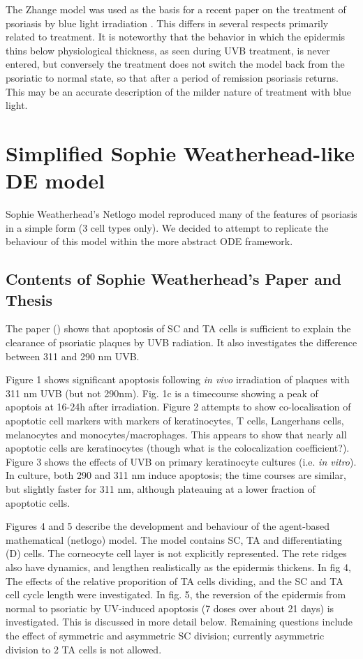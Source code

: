 \documentclass[a4paper,10pt]{report}
\begin{document}
The Zhange model was used as the basis for a recent paper on the treatment of psoriasis by blue light irradiation \cite{garza2017dynamic}. This differs in several respects primarily related to treatment. It is noteworthy that the behavior in which the epidermis thins below physiological thickness, as seen during UVB treatment, is never entered, but conversely the treatment does not switch the model back from the psoriatic to normal state, so that after a period of remission psoriasis returns. This may be an accurate description of the milder nature of treatment with blue light. 

\chapter{Simplified Sophie Weatherhead-like DE model}

Sophie Weatherhead's Netlogo model \cite{weatherhead2011keratinocyte} reproduced many of the features of psoriasis in a simple form (3 cell types only). We decided to attempt to replicate the behaviour of this model within the more abstract ODE framework. 

\section{Contents of Sophie Weatherhead's Paper and Thesis}

The paper (\cite{weatherhead2011keratinocyte}) shows that apoptosis of SC and TA cells is sufficient to explain the clearance of psoriatic plaques by UVB radiation. It also investigates the difference between 311 and 290 nm UVB.

Figure 1 shows significant apoptosis following {\em in vivo} irradiation of plaques with 311 nm UVB (but not 290nm). Fig. 1c is a timecourse showing a peak of apoptois at 16-24h after irradiation. Figure 2 attempts to show co-localisation of apoptotic cell markers with markers of keratinocytes, T cells, Langerhans cells, melanocytes and monocytes/macrophages. This appears to show that nearly all apoptotic cells are keratinocytes (though what is the colocalization coefficient?). Figure 3 shows the effects of UVB on primary keratinocyte cultures (i.e. {\em in vitro}). In culture, both 290 and 311 nm induce apoptosis; the time courses are similar, but slightly faster for 311 nm, although plateauing at a lower fraction of apoptotic cells. 

Figures 4 and 5 describe the development and behaviour of the agent-based mathematical (netlogo) model. The model contains SC, TA and differentiating (D) cells. The corneocyte cell layer is not explicitly represented. The rete ridges also have dynamics, and lengthen realistically as the epidermis thickens. In fig 4, The effects of the relative proporition of TA cells dividing, and the SC and TA cell cycle length were investigated. In fig. 5, the reversion of the epidermis from normal to psoriatic by UV-induced apoptosis (7 doses over about 21 days) is investigated. This is discussed in more detail below.  Remaining  questions include the effect of symmetric and asymmetric SC division; currently asymmetric division to 2 TA cells is not allowed. 
\end{document}
